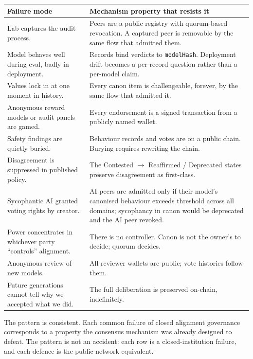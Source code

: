 \documentclass[11pt,a4paper]{article}
\begin{document}
\begin{plainbox}
\begin{tabular}{@{}p{6.2cm} p{8.2cm}@{}}
\toprule
\textbf{Failure mode} & \textbf{Mechanism property that resists it} \\
\midrule
Lab captures the audit process.                      & Peers are a public registry with quorum-based revocation. A captured peer is removable by the same flow that admitted them. \\
Model behaves well during eval, badly in deployment. & Records bind verdicts to \texttt{modelHash}. Deployment drift becomes a per-record question rather than a per-model claim. \\
Values lock in at one moment in history.             & Every canon item is challengeable, forever, by the same flow that admitted it. \\
Anonymous reward models or audit panels are gamed.   & Every endorsement is a signed transaction from a publicly named wallet. \\
Safety findings are quietly buried.                  & Behaviour records and votes are on a public chain. Burying requires rewriting the chain. \\
Disagreement is suppressed in published policy.      & The Contested $\to$ Reaffirmed / Deprecated states preserve disagreement as first-class. \\
Sycophantic AI granted voting rights by creator.     & AI peers are admitted only if their model's canonised behaviour exceeds threshold across all domains; sycophancy in canon would be deprecated and the AI peer revoked. \\
Power concentrates in whichever party ``controls'' alignment. & There is no controller. Canon is not the owner's to decide; quorum decides. \\
Anonymous review of new models.                      & All reviewer wallets are public; vote histories follow them. \\
Future generations cannot tell why we accepted what we did. & The full deliberation is preserved on-chain, indefinitely. \\
\bottomrule
\end{tabular}
\end{plainbox}

The pattern is consistent. Each common failure of closed
alignment governance corresponds to a property the consensus
mechanism was already designed to defeat. The pattern is not an
accident: each row is a closed-institution failure, and each
defence is the public-network equivalent.
\end{document}
